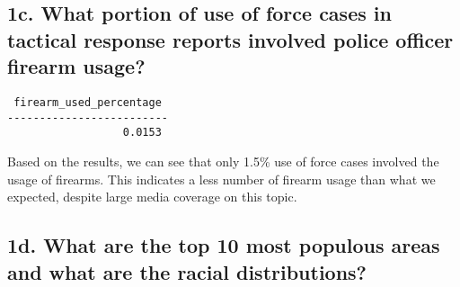 \documentclass[10pt]{article}
\begin{document}
\subsection*{1c. What portion of use of force cases in tactical response reports involved police officer firearm usage?}

\begin{verbatim}
 firearm_used_percentage
-------------------------
                  0.0153
\end{verbatim}

Based on the results, we can see that only 1.5\% use of force cases involved the usage of firearms. This indicates a less number of firearm usage than what we expected, despite large media coverage on this topic.


\subsection*{1d. What are the top 10 most populous areas and what are the racial distributions?}
\end{document}
